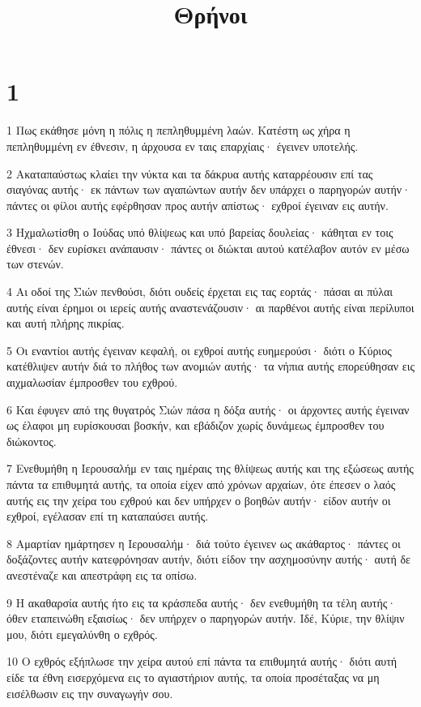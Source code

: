 

\title{Θρήνοι}


\chapter{1}

\par 1 Πως εκάθησε μόνη η πόλις η πεπληθυμμένη λαών. Κατέστη ως χήρα η πεπληθυμμένη εν έθνεσιν, η άρχουσα εν ταις επαρχίαις· έγεινεν υποτελής.
\par 2 Ακαταπαύστως κλαίει την νύκτα και τα δάκρυα αυτής καταρρέουσιν επί τας σιαγόνας αυτής· εκ πάντων των αγαπώντων αυτήν δεν υπάρχει ο παρηγορών αυτήν· πάντες οι φίλοι αυτής εφέρθησαν προς αυτήν απίστως· εχθροί έγειναν εις αυτήν.
\par 3 Ηχμαλωτίσθη ο Ιούδας υπό θλίψεως και υπό βαρείας δουλείας· κάθηται εν τοις έθνεσι· δεν ευρίσκει ανάπαυσιν· πάντες οι διώκται αυτού κατέλαβον αυτόν εν μέσω των στενών.
\par 4 Αι οδοί της Σιών πενθούσι, διότι ουδείς έρχεται εις τας εορτάς· πάσαι αι πύλαι αυτής είναι έρημοι οι ιερείς αυτής αναστενάζουσιν· αι παρθένοι αυτής είναι περίλυποι και αυτή πλήρης πικρίας.
\par 5 Οι εναντίοι αυτής έγειναν κεφαλή, οι εχθροί αυτής ευημερούσι· διότι ο Κύριος κατέθλιψεν αυτήν διά το πλήθος των ανομιών αυτής· τα νήπια αυτής επορεύθησαν εις αιχμαλωσίαν έμπροσθεν του εχθρού.
\par 6 Και έφυγεν από της θυγατρός Σιών πάσα η δόξα αυτής· οι άρχοντες αυτής έγειναν ως έλαφοι μη ευρίσκουσαι βοσκήν, και εβάδιζον χωρίς δυνάμεως έμπροσθεν του διώκοντος.
\par 7 Ενεθυμήθη η Ιερουσαλήμ εν ταις ημέραις της θλίψεως αυτής και της εξώσεως αυτής πάντα τα επιθυμητά αυτής, τα οποία είχεν από χρόνων αρχαίων, ότε έπεσεν ο λαός αυτής εις την χείρα του εχθρού και δεν υπήρχεν ο βοηθών αυτήν· είδον αυτήν οι εχθροί, εγέλασαν επί τη καταπαύσει αυτής.
\par 8 Αμαρτίαν ημάρτησεν η Ιερουσαλήμ· διά τούτο έγεινεν ως ακάθαρτος· πάντες οι δοξάζοντες αυτήν κατεφρόνησαν αυτήν, διότι είδον την ασχημοσύνην αυτής· αυτή δε ανεστέναζε και απεστράφη εις τα οπίσω.
\par 9 Η ακαθαρσία αυτής ήτο εις τα κράσπεδα αυτής· δεν ενεθυμήθη τα τέλη αυτής· όθεν εταπεινώθη εξαισίως· δεν υπήρχεν ο παρηγορών αυτήν. Ιδέ, Κύριε, την θλίψιν μου, διότι εμεγαλύνθη ο εχθρός.
\par 10 Ο εχθρός εξήπλωσε την χείρα αυτού επί πάντα τα επιθυμητά αυτής· διότι αυτή είδε τα έθνη εισερχόμενα εις το αγιαστήριον αυτής, τα οποία προσέταξας να μη εισέλθωσιν εις την συναγωγήν σου.

